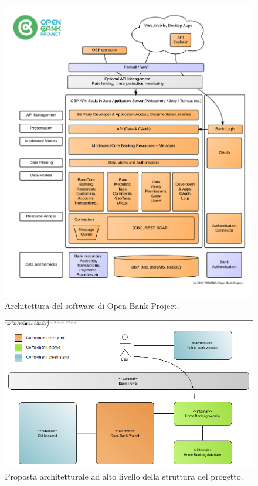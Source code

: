 \documentclass[]{softeng}
\begin{document}
\graphicspath{{Images/}}
\begin{figure}[tp]
	\centering
	\includegraphics[width=\textwidth]{open_bank_project_architecture}
	\caption{Architettura del software di Open Bank Project\cite{obparch}.}
	\label{fig:open_bank_project_architecture}
\end{figure}

\begin{figure}[hbt]
	\centering
	\includegraphics[width=\textwidth]{architettura_sistema}
	\caption{Proposta architetturale ad alto livello della struttura del progetto.}
	\label{fig:project_structure}
\end{figure}
\end{document}
